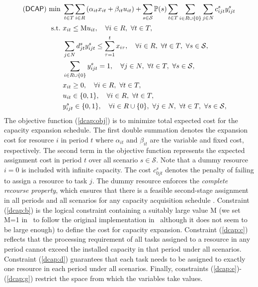 \begin{subequations} \label{dcap:formulation}
	\begin{align}
	(\dcap)\ \textrm{min}\ &\sum_{t\in T}\sum_{i\in R}\left(\alpha_{it}x_{it}+\beta_{it}u_{it}\right)+\sum_{s\in\mathcal{S}}\PP(s)\sum_{t\in T}\sum_{i\in R\cup\{0\}}\sum_{j\in N}c_{ijt}^{s}y_{ijt}^s	\label{dcap:obj} \\
	\textrm{s.t.}\ & x_{it}\le \textrm{M}u_{it},\quad\forall i\in R,\ \forall t\in T,	\label{dcap:b}\\
	&\sum_{j\in N}d_{jt}^s y_{ijt}^s\le\sum_{\tau=1}^{t}x_{i\tau},\quad\forall i\in R,\ \forall t\in T,\ \forall s\in\mathcal{S},\label{dcap:c}\\
	&\sum_{i\in R\cup \{0\}}y_{ijt}^s=1,\quad\forall j\in N,\ \forall t\in T,\ \forall s\in\mathcal{S}, \label{dcap:d} \\
	&x_{it}\ge 0,\quad\forall i\in R,\ \forall t\in T,\label{dcap:e} \\
	&u_{it}\in\{0,1\}, \quad\forall i\in R,\ \forall t\in T,\label{dcap:f}\\
	&y_{ijt}^s\in\{0,1\},\quad\forall i\in R\cup\{0\},\ \forall j\in N,\ \forall t\in T,\ \forall s\in\mathcal{S},\label{dcap:g}
	\end{align}
\end{subequations}
The objective function (\ref{dcap:obj}) is to minimize total expected cost for the capacity expansion schedule. The first double summation denotes the expansion cost for resource $i$ in period $t$ where $\alpha_{it}$ and $\beta_{it}$ are the variable and fixed cost, respectively. The second term in the objective function represents the expected assignment cost in period $t$ over all scenario $s\in\mathcal{S}$. Note that a dummy resource $i=0$ is included with infinite capacity. The cost $c_{0jt}^s$ denotes the penalty of failing to assign a resource to task $j$. The dummy resource enforces the \textit{complete recourse property}, which ensures that there is a feasible second-stage assignment in all periods and all scenarios for any capacity acquisition schedule \cite{journal:AG2004}. Constraint (\ref{dcap:b}) is the logical constraint containing a suitably large value M (we set M=1 in \siplibtwo\ to follow the original implementation in \siplib\, although it does not seem to be large enough) to define the cost for capacity expansion. Constraint (\ref{dcap:c}) reflects that the processing requirement of all tasks assigned to a resource in any period cannot exceed the installed capacity in that period under all scenarios. Constraint (\ref{dcap:d}) guarantees that each task needs to be assigned to exactly one resource in each period under all scenarios. Finally, constraints (\ref{dcap:e})-(\ref{dcap:g}) restrict the space from which the variables take values.

